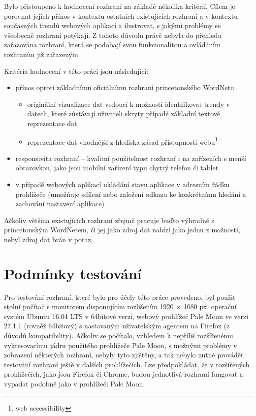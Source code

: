 \documentclass[a4paper, 11pt, oneside]{book}
\begin{document}
				Bylo přistoupeno k hodnocení rozhraní na základě několika kritérií. Cílem je porovnat jejich přínos v kontextu ostatních existujících rozhraní a v kontextu současných trendů webových aplikací a ilustrovat, s jakými problémy se všeobecně rozhraní potýkají.  Z tohoto důvodu právě nebyla do přehledu zařazována rozhraní, která se podobají svou funkcionalitou a ovládáním rozhraním již zařazeným. 

				Kritéria hodnocení v této práci jsou následující:

					\begin{itemize}
						\item přínos oproti základnímu oficiálnímu rozhraní princetonského WordNetu
							\begin{itemize}
								\item originální vizualizace dat vedoucí k možnosti identifikovat trendy v datech, které zůstávají uživateli skryty případě základní textové reprezentace dat
								\item reprezentace dat vhodnější z hlediska zásad přístupnosti webu\footnote{web accessibility}
							\end{itemize}
						\item responsivita rozhraní -- kvalitní použitelnost rozhraní i na zařízeních s menší obrazovkou, jako jsou mobilní zařízení typu chytrý telefon či tablet
						\item v případě webových aplikací ukládání stavu aplikace v adresním řádku prohlížeče (umožňuje sdílení nebo založení odkazu ke konkrétnímu hledání a zachování nastavení aplikace)
					\end{itemize}

				Ačkoliv většina existujících rozhraní zřejmě pracuje buďto výhradně s princetonským WordNetem, či jej jako zdroj dat nabízí jako jednu z možností, nebyl zdroj dat brán v potaz.

			\section{Podmínky testování}

				Pro testování rozhraní, které bylo pro účely této práce provedeno, byl použit stolní počítač s monitorem disponujícím rozlišením 1920 × 1080 px, operační systém Ubuntu 16.04 LTS v 64bitové verzi, webový prohlížeč Pale Moon ve verzi 27.1.1 (rovněž 64bitový) s nastavaným uživatelským agentem na Firefox (z důvodů kompatibility). Ačkoliv se počítalo, vzhledem k nepříliš rozšířenému vykresovacímu jádru použitého prohlížeče Pale Moon, s možnými problémy v zobrazení některých rozhraní, nebyly tyto zjištěny, a tak nebylo nutné provádět testování rozhraní ještě v dalších prohlížečích. Lze předpokládat, že v rozšířených prohlížečích, jako jsou Firefox či Chrome, budou jednotlivá rozhraní fungovat a vypadat podobně jako v prohlížeči Pale Moon.
\end{document}
